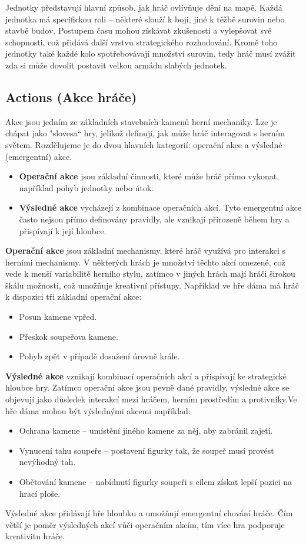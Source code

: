 Jednotky představují hlavní způsob, jak hráč ovlivňuje dění na mapě. Každá jednotka má specifickou roli – některé slouží k boji, jiné k těžbě surovin nebo stavbě budov. Postupem času mohou získávat zkušenosti a vylepšovat své schopnosti, což přidává další vrstvu strategického rozhodování. Kromě toho jednotky také každé kolo spotřebovávají množství surovin, tedy hráč musí zvážit zda si může dovolit postavit velkou armádu slabých jednotek.


\subsection{Actions (Akce hráče)}

Akce jsou jedním ze základních stavebních kamenů herní mechaniky. Lze je chápat jako "slovesa“ hry, jelikož definují, jak může hráč interagovat s herním světem. Rozdělujeme je do dvou hlavních kategorií: operační akce a výsledné (emergentní) akce.

\begin{itemize}
    \item \textbf{Operační akce} jsou základní činnosti, které může hráč přímo vykonat, například pohyb jednotky nebo útok.
    \item \textbf{Výsledné akce} vycházejí z kombinace operačních akcí. Tyto emergentní akce často nejsou přímo definovány pravidly, ale vznikají přirozeně během hry a přispívají k její hloubce.
\end{itemize}

\textbf{Operační akce} jsou základní mechanismy, které hráč využívá pro interakci s herními mechanismy. V některých hrách je množství těchto akcí omezené, což vede k menší variabilitě herního stylu, zatímco v jiných hrách mají hráči širokou škálu možností, což umožňuje kreativní přístupy. Například ve hře dáma má hráč k dispozici tři základní operační akce:
\begin{itemize}
    \item Posun kamene vpřed.
    \item Přeskok soupeřova kamene.
    \item Pohyb zpět v případě dosažení úrovně krále.
\end{itemize}

\textbf{Výsledné akce} vznikají kombinací operačních akcí a přispívají ke strategické hloubce hry. Zatímco operační akce jsou pevně dané pravidly, výsledné akce se objevují jako důsledek interakcí mezi hráčem, herním prostředím a protivníky.Ve hře dáma mohou být výslednými akcemi například:
\begin{itemize}
    \item Ochrana kamene -- umístění jiného kamene za něj, aby zabránil zajetí.
    \item Vynucení tahu soupeře -- postavení figurky tak, že soupeř musí provést nevýhodný tah.
    \item Obětování kamene -- nabídnutí figurky soupeři s cílem získat lepší pozici na hrací ploše.
\end{itemize}
Výsledné akce přidávají hře hloubku a umožňují emergentní chování hráče. Čím větší je poměr výsledných akcí vůči operačním akcím, tím více hra podporuje kreativitu hráče.

